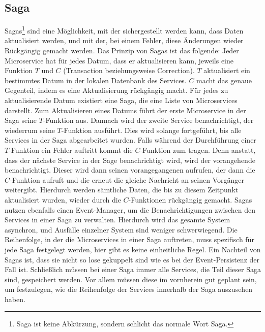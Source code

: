 \subsection{Saga}
Sagas\footnote{Saga ist keine Abkürzung, sondern schlicht das normale Wort \glqq Saga\grqq.} sind eine Möglichkeit, mit der sichergestellt werden kann, dass Daten aktualisiert werden, und mit der, bei einem Fehler, diese Änderungen wieder Rückgängig gemacht werden.
Das Prinzip von Sagas ist das folgende:
Jeder Microservice hat für jedes Datum, dass er aktualisieren kann, jeweils eine Funktion $T$ und $C$ (Transaction beziehungsweise Correction). $T$ aktualisiert ein bestimmtes Datum in der lokalen Datenbank des Services. $C$ macht das genaue Gegenteil, indem es eine Aktualisierung rückgängig macht. Für jedes zu aktualisierende Datum existiert eine Saga, die eine Liste von Microservices darstellt. Zum Aktualisieren eines Datums führt der erste Microservice in der Saga seine $T$-Funktion aus. Dannach wird der zweite Service benachrichtigt, der wiederrum seine $T$-Funktion ausführt. Dies wird solange fortgeführt, bis alle Services in der Saga abgearbeitet wurden. Falls während der Durchführung einer $T$-Funktion ein Fehler auftritt kommt die $C$-Funktion zum tragen. Denn anstatt, dass der nächste Service in der Sage benachrichtigt wird, wird der vorangehende benachrichtigt. Dieser wird dann seinen vorangegangenen aufrufen, der dann die $C$-Funktion aufruft und die erneut die gleiche Nachricht an seinen Vorgänger weitergibt. Hierdurch werden sämtliche Daten, die bis zu diesem Zeitpunkt aktualisiert wurden, wieder durch die $C$-Funktionen rückgängig gemacht.
Sagas nutzen ebenfalls einen Event-Manager, um die Benachrichtigungen zwischen den Services in einer Saga zu verwalten. Hierdurch wird das gesamte System asynchron, und Ausfälle einzelner System sind weniger schwerwiegend.
Die Reihenfolge, in der die Microservices in einer Saga auftreten, muss spezifisch für jede Saga festgelegt werden, hier gibt es keine einheitliche Regel.
Ein Nachteil von Sagas ist, dass sie nicht so lose gekuppelt sind wie es bei der Event-Persistenz der Fall ist. Schließlich müssen bei einer Saga immer alle Services, die Teil dieser Saga sind, gespeichert werden. Vor allem müssen diese im vornherein gut geplant sein, um festzulegen, wie die Reihenfolge der Services innerhalb der Saga auszusehen haben.
